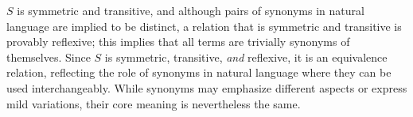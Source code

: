 $S$ is symmetric and transitive, and although pairs of
synonyms in natural language are implied to be distinct, a relation that is
symmetric and transitive is provably reflexive; this implies that all terms are
trivially synonyms of themselves. Since $S$ is symmetric, transitive,
\emph{and} reflexive, it is an equivalence relation, reflecting the role of
synonyms in natural language where they can be used interchangeably. While
synonyms may emphasize different aspects or express mild variations, their core
meaning is nevertheless the same.




